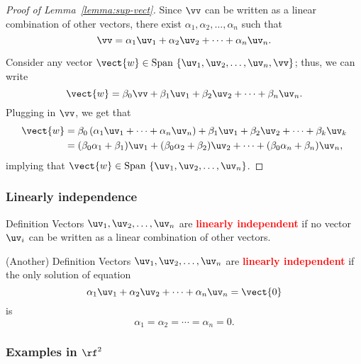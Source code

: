 \begin{frame}
  \begin{proof}[Proof of Lemma~\ref{lemma:sup-vect}]

    {\small
      
      Since $\vv$ can be written as a linear combination of other
      vectors, there exist $\alpha_1,\alpha_2,\ldots,\alpha_n$ such
      that
      \[
      \vv = \alpha_1\uv_1+\alpha_2\uv_2+\cdots+\alpha_n\uv_n.
      \]
      
      Consider any vector $\vect{w}\in\mathrm{Span}~\{\uv_1,\uv_2,\ldots,\uv_n,\vv\}$; thus, we can write
      \[
      \vect{w} = \beta_0\vv + \beta_1\uv_1 + \beta_2\uv_2 +\cdots+\beta_n\uv_n.
      \]
      Plugging in $\vv$, we get that
      \begin{align*}
        \vect{w} & =  \beta_0\left(\alpha_1\uv_1+\cdots+\alpha_n\uv_n\right) + \beta_1\uv_1 + \beta_2\uv_2 +\cdots+\beta_k\uv_k \\
        &= (\beta_0\alpha_1+\beta_1)\uv_1 +
        (\beta_0\alpha_2+\beta_2)\uv_2 +
        \cdots+(\beta_0\alpha_n+\beta_n)\uv_n,
      \end{align*}
      implying that $\vect{w}\in\mathrm{Span}~\{\uv_1,\uv_2,\ldots,\uv_n\}$.

    }
  \end{proof}
\end{frame}

\begin{frame}
  \frametitle{Linearly independence}

  \begin{block}{Definition}
    Vectors $\uv_1,\uv_2,\ldots,\uv_n$ are \textcolor{red}{\bf
      linearly independent} if no vector $\uv_i$ can be written as a
    linear combination of other vectors.
  \end{block}

  \pause

  \begin{block}{(Another) Definition}
    Vectors $\uv_1,\uv_2,\ldots,\uv_n$ are \textcolor{red}{\bf
      linearly independent} if the only solution of equation
    \[
    \alpha_1\uv_1 + \alpha_2\uv_2 +\cdots+\alpha_n\uv_n = \vect{0}
    \]
    is
    \[
    \alpha_1=\alpha_2=\cdots=\alpha_n=0.
    \]
  \end{block}

\end{frame}

\begin{frame}
  \frametitle{Examples in $\rf^2$}
\end{frame}

